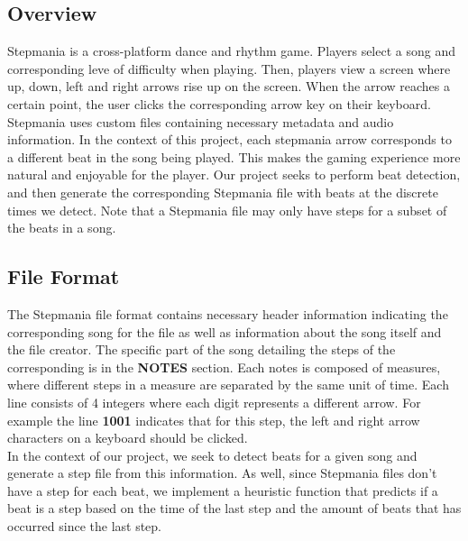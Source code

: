\subsection{Overview}

Stepmania is a cross-platform dance and rhythm game. Players select a song and corresponding leve of difficulty when playing. Then, players view a screen where up, down, left and right arrows rise up on the screen. When the arrow reaches a certain point, the user clicks the corresponding arrow key on their keyboard.\\

Stepmania uses custom files containing necessary metadata and audio information. In the context of this project, each stepmania arrow corresponds to a different beat in the song being played. This makes the gaming experience more natural and enjoyable for the player. Our project seeks to perform beat detection, and then generate the corresponding Stepmania file with beats at the discrete times we detect. Note that a Stepmania file may only have steps for a subset of the beats in a song.\\

\subsection{File Format}

The Stepmania file format contains necessary header information indicating the corresponding song for the file as well as information about the song itself and the file creator. The specific part of the song detailing the steps of the corresponding is in the \textbf{NOTES} section. Each notes is composed of measures, where different steps in a measure are separated by the same unit of time. Each line consists of 4 integers where each digit represents a different arrow. For example the line \textbf{1001} indicates that for this step, the left and right arrow characters on a keyboard should be clicked.\\

In the context of our project, we seek to detect beats for a given song and generate a step file from this information. As well, since Stepmania files don't have a step for each beat, we implement a heuristic function that predicts if a beat is a step based on the time of the last step and the amount of beats that has occurred since the last step.\\

